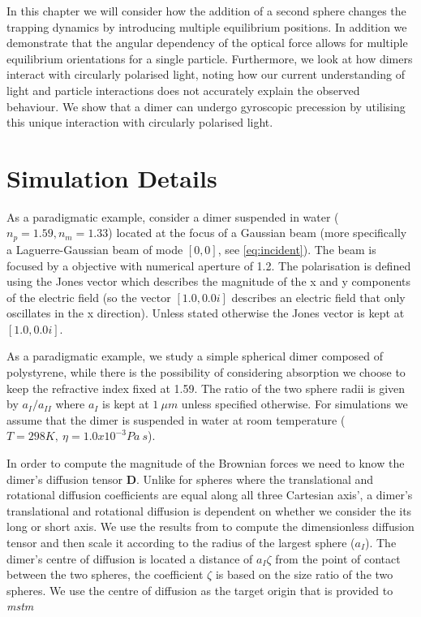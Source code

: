  In this chapter we will consider how the addition of a 
 second sphere changes the trapping dynamics by introducing 
 multiple equilibrium positions. In addition we demonstrate 
 that the angular dependency of the optical force allows for 
 multiple equilibrium orientations for a single particle. 
 Furthermore, we look at how dimers interact with circularly 
 polarised light, noting how our current understanding of 
 light and particle interactions does not accurately explain 
 the observed behaviour. We show that a dimer can undergo 
 gyroscopic precession by utilising this unique interaction 
 with circularly polarised light.  
 
\section{Simulation Details}
As a paradigmatic example, consider a dimer suspended in 
water ($n_p = 1.59, n_m = 1.33$) located at the focus of 
a Gaussian beam (more specifically a Laguerre-Gaussian 
beam of mode $[0,0]$, see \eqref{eq:incident}). The beam 
is focused by a objective with numerical aperture of 1.2.
The polarisation is defined using the Jones vector which 
describes the magnitude of the x and y components of the 
electric field (so the vector $[1.0, 0.0i]$ describes an 
electric field that only oscillates in the x direction). 
Unless stated otherwise the Jones vector is kept at $[1.0, 
0.0i]$. 

As a paradigmatic example, we study a simple spherical 
dimer composed of polystyrene, while there is the 
possibility of considering absorption we choose to keep 
the refractive index fixed at 1.59. The ratio of the two 
sphere radii is given by $a_{I}/a_{II}$ where $a_{I}$ is 
kept at $1\ \mu m$ unless specified otherwise. For 
simulations we assume that the dimer is suspended in water 
at room temperature ($T = 298K,\ \eta = 1.0x10^{-3}Pa\ s$).

In order to compute the magnitude of the Brownian forces we
need to know the dimer's diffusion tensor \textbf{D}. Unlike
for spheres where the translational and rotational diffusion 
coefficients are equal along all three Cartesian axis', a
dimer's translational and rotational diffusion is dependent
on whether we consider the its long or short axis. We use
the results from \cite{Nir1973} to compute the dimensionless 
diffusion tensor and then scale it according to the radius of
the largest sphere ($a_I$). The dimer's centre of diffusion
is located a distance of $a_I\zeta$ from the point of contact
between the two spheres, the coefficient $\zeta$ is based on
the size ratio of the two spheres. We use the centre of 
diffusion as the target origin that is provided to \textit{mstm}



